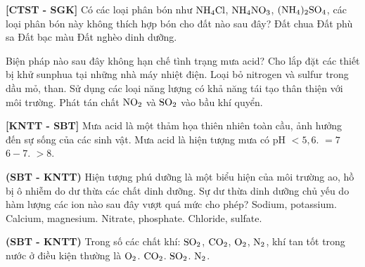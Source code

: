\documentclass[12pt,a4paper]{article}
\begin{document}
\begin{ex}
\textbf{[CTST - SGK]} Có các loại phân bón như $\ce{NH4Cl}$, $\ce{NH4NO3}$, $\ce{(NH4)2SO4}$, các loại phân bón này không thích hợp bón cho đất nào sau đây?
\choice
{\True Đất chua}
{Đất phù sa}
{Đất bạc màu}
{Đất nghèo dinh dưỡng.}
\end{ex}

\begin{ex}
Biện pháp nào sau đây không hạn chế tình trạng mưa acid?
\choice
{Cho lắp đặt các thiết bị khử sunphua tại những nhà máy nhiệt điện.}
{Loại bỏ nitrogen và sulfur trong dầu mỏ, than.}
{Sử dụng các loại năng lượng có khả năng tái tạo thân thiện với môi trường.}
{\True Phát tán chất $\ce{NO2}$ và $\ce{SO2}$ vào bầu khí quyển.}
\end{ex}

\begin{ex}
\textbf{[KNTT - SBT]} Mưa acid là một thảm họa thiên nhiên toàn cầu, ảnh hưởng đến sự sống của các sinh vật. Mưa acid là hiện tượng mưa có pH
\choice
{\True $< 5{,}6.$}
{$= 7$}
{$6 - 7.$}
{$> 8.$}
\end{ex}

\begin{ex}
\textbf{(SBT - KNTT)} Hiện tượng phú dưỡng là một biểu hiện của môi trường ao, hồ bị ô nhiễm do dư thừa các chất dinh dưỡng. Sự dư thừa dinh dưỡng chủ yếu do hàm lượng các ion nào sau đây vượt quá mức cho phép?
\choice
{Sodium, potassium.}
{Calcium, magnesium.}
{\True Nitrate, phosphate.}
{Chloride, sulfate.}
\end{ex}

\begin{ex}
\textbf{(SBT - KNTT)} Trong số các chất khí: $\ce{SO2}$, $\ce{CO2}$, $\ce{O2}$, $\ce{N2}$, khí tan tốt trong nước ở điều kiện thường là
\choice
{$\ce{O2}$.}
{$\ce{CO2}$.}
{\True $\ce{SO2}$.}
{$\ce{N2}$.}
\end{ex}
\end{document}
